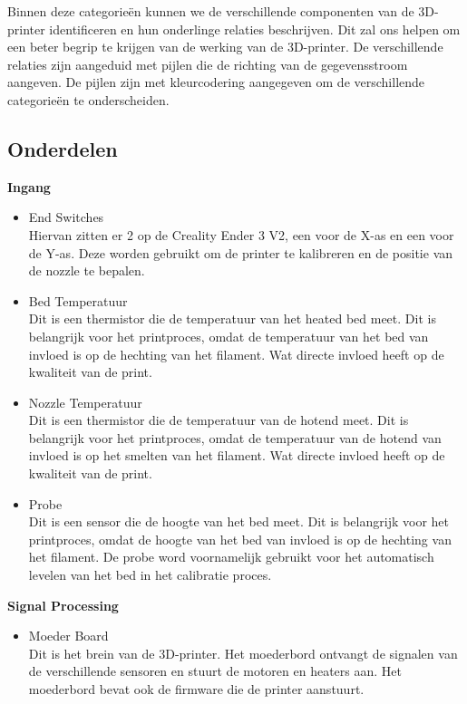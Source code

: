 \documentclass{article}
\begin{document}
Binnen deze categorieën kunnen we de verschillende componenten van de 3D-printer identificeren en hun onderlinge relaties beschrijven. Dit zal ons helpen om een beter begrip te krijgen van de werking van de 3D-printer. De verschillende relaties zijn aangeduid met pijlen die de richting van de gegevensstroom aangeven. De pijlen zijn met kleurcodering aangegeven om de verschillende categorieën te onderscheiden.

\subsection{Onderdelen}
\textbf{Ingang}
\begin{itemize}
  \item End Switches\\
  Hiervan zitten er 2 op de Creality Ender 3 V2, een voor de X-as en een voor de Y-as. Deze worden gebruikt om de printer te kalibreren en de positie van de nozzle te bepalen.
  \item Bed Temperatuur\\
  Dit is een thermistor die de temperatuur van het heated bed meet. Dit is belangrijk voor het printproces, omdat de temperatuur van het bed van invloed is op de hechting van het filament. Wat directe invloed heeft op de kwaliteit van de print.
  \item Nozzle Temperatuur\\
  Dit is een thermistor die de temperatuur van de hotend meet. Dit is belangrijk voor het printproces, omdat de temperatuur van de hotend van invloed is op het smelten van het filament. Wat directe invloed heeft op de kwaliteit van de print.
  \item Probe\\
  Dit is een sensor die de hoogte van het bed meet. Dit is belangrijk voor het printproces, omdat de hoogte van het bed van invloed is op de hechting van het filament. De probe word voornamelijk gebruikt voor het automatisch levelen van het bed in het calibratie proces.
\end{itemize}

\textbf{Signal Processing}
\begin{itemize}
  \item Moeder Board\\
  Dit is het brein van de 3D-printer. Het moederbord ontvangt de signalen van de verschillende sensoren en stuurt de motoren en heaters aan. Het moederbord bevat ook de firmware die de printer aanstuurt.
\end{itemize}
\end{document}
